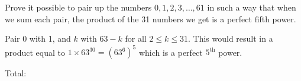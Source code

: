 \documentclass[a4paper,12pt,addpoints]{exam}
\begin{document}
\begin{questions}
\question[3] Prove it possible to pair up the numbers $0, 1, 2, 3, \ldots , 61$ in such a way that when we sum each pair, the product of the 31 numbers we get is a perfect fifth power.
\begin{solution}
    Pair 0 with 1, and $k$ with $63-k$ for all $2 \leq k \leq 31 $. This would result in a product equal to $1 \times 63^{30} = (63^6)^5$ which is a perfect $5^{\text{th}}$ power.
\end{solution}

\end{questions}

Total: \numpoints
\end{document}
